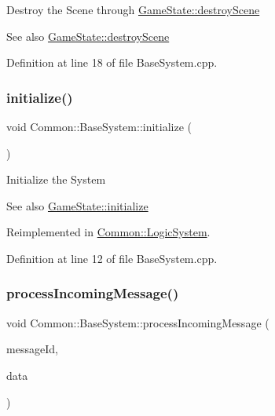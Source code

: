 Destroy the Scene through \hyperlink{class_common_1_1_game_state_a03176055b9cb064b2cea5b64cbf6647a}{Game\+State\+::destroy\+Scene} \begin{DoxySeeAlso}{See also}
\hyperlink{class_common_1_1_game_state_a03176055b9cb064b2cea5b64cbf6647a}{Game\+State\+::destroy\+Scene} 
\end{DoxySeeAlso}


Definition at line 18 of file Base\+System.\+cpp.

\mbox{\label{class_common_1_1_base_system_a84f42ac8703c9121f29e341070a26c4f}} 
\subsubsection{\texorpdfstring{initialize()}{initialize()}}
{\footnotesize\ttfamily void Common\+::\+Base\+System\+::initialize (\begin{DoxyParamCaption}\item[{void}]{ }\end{DoxyParamCaption})\hspace{0.3cm}{\ttfamily [virtual]}}

Initialize the System \begin{DoxySeeAlso}{See also}
\hyperlink{class_common_1_1_game_state_a4e7fa2fbc9080111213ce379eb33d082}{Game\+State\+::initialize} 
\end{DoxySeeAlso}


Reimplemented in \hyperlink{class_common_1_1_logic_system_a6e1389a1e2ed8dd21b46fabdedee5d22}{Common\+::\+Logic\+System}.



Definition at line 12 of file Base\+System.\+cpp.

\mbox{\label{class_common_1_1_base_system_a6820dfed1ee63f376e5773b361e3d2a8}} 
\subsubsection{\texorpdfstring{process\+Incoming\+Message()}{processIncomingMessage()}}
{\footnotesize\ttfamily void Common\+::\+Base\+System\+::process\+Incoming\+Message (\begin{DoxyParamCaption}\item[{\hyperlink{group___common_gaa8c87d2b450282716c906da283e149e6}{Mq\+::\+Message\+Id}}]{message\+Id,  }\item[{const void $\ast$}]{data }\end{DoxyParamCaption})\hspace{0.3cm}{\ttfamily [virtual]}}

